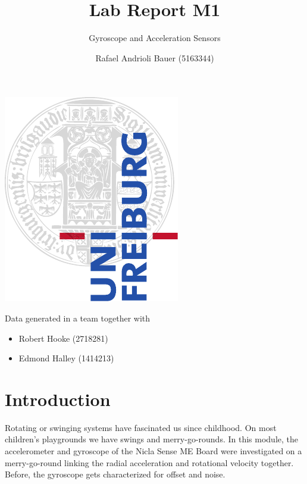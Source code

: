 \documentclass[DIV=14]{scrarticle}
\title{Lab Report M1}
\subtitle{Gyroscope and Acceleration Sensors}
\author{Rafael Andrioli Bauer (5163344)}
\begin{document}
\maketitle

\thispagestyle{empty}

\vfill
\begin{center}
    \includegraphics{ufcd-logo-e1-a4-color.pdf} \vspace{1cm} \\ 
\end{center}
\vfill

\begin{flushleft}
Data generated in a team together with
\begin{itemize}
    \item Robert Hooke (2718281)
    \item Edmond Halley (1414213)
\end{itemize}
\end{flushleft}



\clearpage

\section{Introduction}

Rotating or swinging systems have fascinated us since childhood. On most children’s playgrounds we have swings and merry-go-rounds. In this module, the accelerometer and gyroscope of the Nicla Sense ME Board were investigated on a merry-go-round linking the radial acceleration and rotational velocity together. Before, the gyroscope gets characterized for offset and noise. \cite{labManual}
\end{document}
